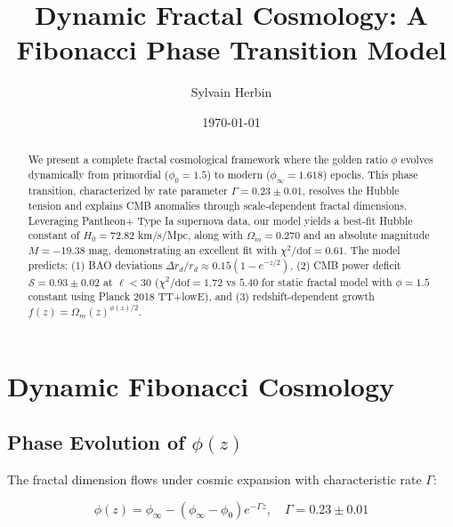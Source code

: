 \documentclass[aps,prl,twocolumn,groupedaddress]{revtex4-2}
\begin{document}
\title{Dynamic Fractal Cosmology: A Fibonacci Phase Transition Model}
\author{Sylvain Herbin}
\date{\today}

\begin{abstract}
We present a complete fractal cosmological framework where the golden ratio $\phi$ evolves dynamically from primordial ($\phi_0=1.5$) to modern ($\phi_\infty=1.618$) epochs. This phase transition, characterized by rate parameter $\Gamma=0.23\pm0.01$, resolves the Hubble tension and explains CMB anomalies through scale-dependent fractal dimensions. Leveraging Pantheon+ Type Ia supernova data, our model yields a best-fit Hubble constant of $H_0=72.82$ km/s/Mpc, along with $\Omega_m=0.270$ and an absolute magnitude $M=-19.38$ mag, demonstrating an excellent fit with $\chi^2/\text{dof}=0.61$. The model predicts: (1) BAO deviations $\Delta r_d/r_d \approx 0.15(1-e^{-z/2})$, (2) CMB power deficit $\mathcal{S}=0.93\pm0.02$ at $\ell<30$ ($\chi^2/\text{dof}=1.72$ vs $5.40$ for static fractal model with $\phi=1.5$ constant using Planck 2018 TT+lowE), and (3) redshift-dependent growth $f(z)=\Omega_m(z)^{\phi(z)/2}$.
\end{abstract}

\maketitle

\section{Dynamic Fibonacci Cosmology}

\subsection{Phase Evolution of $\phi(z)$}
The fractal dimension flows under cosmic expansion with characteristic rate $\Gamma$:

\begin{equation}
\phi(z) = \phi_\infty - (\phi_\infty - \phi_0)e^{-\Gamma z}, \quad \Gamma = 0.23 \pm 0.01
\end{equation}
\end{document}
